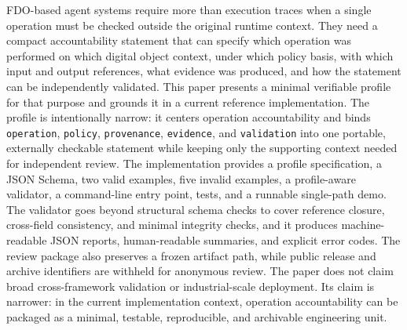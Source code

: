 FDO-based agent systems require more than execution traces when a single operation must be checked outside the original runtime context. They need a compact accountability statement that can specify which operation was performed on which digital object context, under which policy basis, with which input and output references, what evidence was produced, and how the statement can be independently validated. This paper presents a minimal verifiable profile for that purpose and grounds it in a current reference implementation. The profile is intentionally narrow: it centers operation accountability and binds \texttt{operation}, \texttt{policy}, \texttt{provenance}, \texttt{evidence}, and \texttt{validation} into one portable, externally checkable statement while keeping only the supporting context needed for independent review. The implementation provides a profile specification, a JSON Schema, two valid examples, five invalid examples, a profile-aware validator, a command-line entry point, tests, and a runnable single-path demo. The validator goes beyond structural schema checks to cover reference closure, cross-field consistency, and minimal integrity checks, and it produces machine-readable JSON reports, human-readable summaries, and explicit error codes. The review package also preserves a frozen artifact path, while public release and archive identifiers are withheld for anonymous review. The paper does not claim broad cross-framework validation or industrial-scale deployment. Its claim is narrower: in the current implementation context, operation accountability can be packaged as a minimal, testable, reproducible, and archivable engineering unit.
